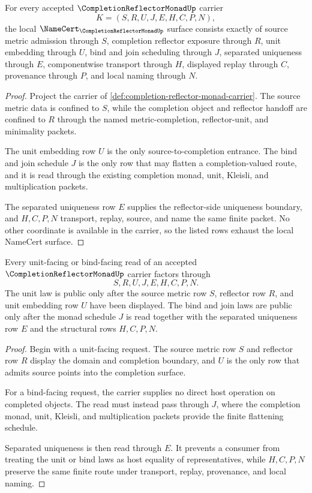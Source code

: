 \begin{theorem}
\label{thm:completion-reflector-monad-namecert-obligations}
For every accepted $\CompletionReflectorMonadUp$ carrier
$$
K=(S,R,U,J,E,H,C,P,N),
$$
the local $\NameCert_{\CompletionReflectorMonadUp}$ surface consists exactly of source metric admission through $S$, completion reflector exposure through $R$, unit embedding through $U$, bind and join scheduling through $J$, separated uniqueness through $E$, componentwise transport through $H$, displayed replay through $C$, provenance through $P$, and local naming through $N$.
\end{theorem}
\begin{proof}
Project the carrier of \autoref{def:completion-reflector-monad-carrier}. The source metric data is confined to $S$, while the completion object and reflector handoff are confined to $R$ through the named metric-completion, reflector-unit, and minimality packets.

The unit embedding row $U$ is the only source-to-completion entrance. The bind and join schedule $J$ is the only row that may flatten a completion-valued route, and it is read through the existing completion monad, unit, Kleisli, and multiplication packets.

The separated uniqueness row $E$ supplies the reflector-side uniqueness boundary, and $H,C,P,N$ transport, replay, source, and name the same finite packet. No other coordinate is available in the carrier, so the listed rows exhaust the local NameCert surface.
\end{proof}

\begin{theorem}
\label{thm:completion-reflector-monad-unit-bind-laws}
Every unit-facing or bind-facing read of an accepted $\CompletionReflectorMonadUp$ carrier factors through
$$
S,R,U,J,E,H,C,P,N .
$$
The unit law is public only after the source metric row $S$, reflector row $R$, and unit embedding row $U$ have been displayed. The bind and join laws are public only after the monad schedule $J$ is read together with the separated uniqueness row $E$ and the structural rows $H,C,P,N$.
\end{theorem}
\begin{proof}
Begin with a unit-facing request. The source metric row $S$ and reflector row $R$ display the domain and completion boundary, and $U$ is the only row that admits source points into the completion surface.

For a bind-facing request, the carrier supplies no direct host operation on completed objects. The read must instead pass through $J$, where the completion monad, unit, Kleisli, and multiplication packets provide the finite flattening schedule.

Separated uniqueness is then read through $E$. It prevents a consumer from treating the unit or bind laws as host equality of representatives, while $H,C,P,N$ preserve the same finite route under transport, replay, provenance, and local naming.
\end{proof}

